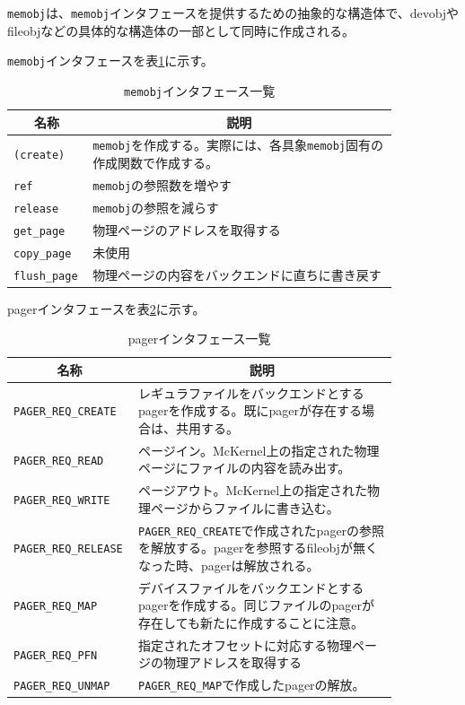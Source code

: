 \documentclass[twoside,11pt,fleqn]{book}
\begin{document}
{\texttt{memobj}は、\texttt{memobj}インタフェースを提供するための抽象的な構造体で、devobjやfileobjなどの具体的な構造体の一部として同時に作成される。

\texttt{memobj}インタフェースを表\ref{tab:memobjif}に示す。
\begin{table}[!htb]
\centering
\footnotesize
\caption{\texttt{memobj}インタフェース一覧}\vspace{0.0em}
\label{tab:memobjif}
\begin{tabular}{|p{0.10\linewidth}|p{0.75\linewidth}|} \hline
\multicolumn{1}{|c}{\textbf{名称}}&\multicolumn{1}{|c|}{\textbf{説明}}\\ \hline \hline
\texttt{(create)}&\texttt{memobj}を作成する。実際には、各具象\texttt{memobj}固有の作成関数で作成する。\\ \hline
\texttt{ref}&\texttt{memobj}の参照数を増やす\\ \hline
\texttt{release}&\texttt{memobj}の参照を減らす\\ \hline
\texttt{get\_page}&物理ページのアドレスを取得する\\ \hline
\texttt{copy\_page}&未使用\\ \hline
\texttt{flush\_page}&物理ページの内容をバックエンドに直ちに書き戻す\\ \hline
\end{tabular}
\vspace{-0em}
\end{table}
\FloatBarrier

pagerインタフェースを表\ref{tab:pagerif}に示す。
\begin{table}[!htb]
\centering
\footnotesize
\caption{pagerインタフェース一覧}\vspace{0.0em}
\label{tab:pagerif}
\begin{tabular}{|p{0.20\linewidth}|p{0.65\linewidth}|} \hline
\multicolumn{1}{|c}{\textbf{名称}}&\multicolumn{1}{|c|}{\textbf{説明}}\\ \hline \hline
\texttt{PAGER\_REQ\_CREATE}&レギュラファイルをバックエンドとするpagerを作成する。既にpagerが存在する場合は、共用する。\\ \hline
\texttt{PAGER\_REQ\_READ}&ページイン。McKernel上の指定された物理ページにファイルの内容を読み出す。\\ \hline
\texttt{PAGER\_REQ\_WRITE}&ページアウト。McKernel上の指定された物理ページからファイルに書き込む。\\ \hline
\texttt{PAGER\_REQ\_RELEASE}&\texttt{PAGER\_REQ\_CREATE}で作成されたpagerの参照を解放する。pagerを参照するfileobjが無くなった時、pagerは解放される。\\ \hline
\texttt{PAGER\_REQ\_MAP}&デバイスファイルをバックエンドとするpagerを作成する。同じファイルのpagerが存在しても新たに作成することに注意。\\ \hline
\texttt{PAGER\_REQ\_PFN}&指定されたオフセットに対応する物理ページの物理アドレスを取得する\\ \hline
\texttt{PAGER\_REQ\_UNMAP}&\texttt{PAGER\_REQ\_MAP}で作成したpagerの解放。\\ \hline
\end{tabular}
\vspace{-0em}
\end{table}
\FloatBarrier
}
\end{document}
